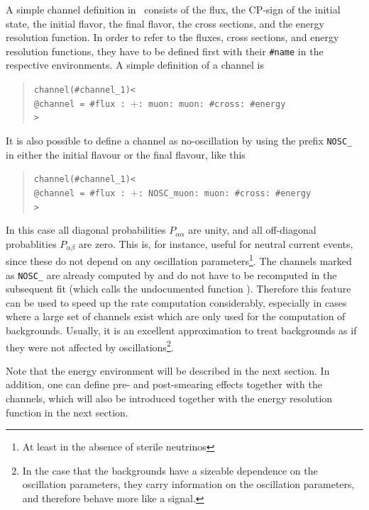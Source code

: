 A simple channel definition in \GLOBES\ consists of the flux,
the CP-sign of the initial state, the initial flavor, the final flavor,
the cross sections, and the energy resolution function. In order to refer to
the fluxes, cross sections, and energy resolution functions, they have to be 
defined first with their {\tt \#name} in the respective environments. 
A simple definition of a channel is
\begin{quote}
{\tt channel(\#channel\_1)<\\
\tb @channel = \#flux : $+$: muon: muon: \#cross: \#energy\\
>}
\end{quote}
%
It is also possible to define a channel as no-oscillation by using the
prefix {\tt NOSC\_} 
in either the initial  flavour or 
the final flavour, like this
\begin{quote}
{\tt channel(\#channel\_1)<\\
\tb @channel = \#flux : $+$: NOSC\_muon: muon: \#cross: \#energy\\
>}
\end{quote}
%
In this case all diagonal probabilities $P_{\alpha\alpha}$ are unity, and all off-diagonal probablities  $P_{\alpha\beta}$ are zero. This is,
for instance, useful for
neutral current events, since these do not depend on any oscillation 
parameters\footnote{At least in the absence of sterile neutrinos}. The channels
marked as {\tt NOSC\_} are already computed by 
and do not have to be recomputed in the subsequent fit (which calls the undocumented function ).
Therefore this feature can be used to speed up the rate 
computation considerably, especially in cases where a large set
of channels exist which are only used for the computation of backgrounds.
Usually, it is an excellent approximation to treat backgrounds as if they
were not affected by oscillations\footnote{In the case that the backgrounds have
a sizeable dependence on the oscillation parameters, they carry information
on the oscillation parameters, and therefore behave more like a signal.}.

Note that the energy environment will be described in the next section. 
In addition, one can define pre- and post-smearing effects together
with the channels, which will also be introduced together with the
energy resolution function in the next section.

